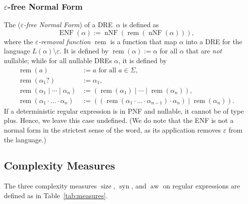 \documentclass[a4paper,11pt, svgnames,titlepage]{article}
\newcommand{\rxp}{{^\mathtt{+}}}
\newcommand{\rxo}{\mathtt{?}}
\newcommand{\rxc}{\cdot}
\DeclareMathOperator{\ror}{\mathtt{|}}
\newcommand{\emptyword}{\varepsilon}
\newcommand{\df}{:=}
\newcommand{\rulefivefun}{p_{R}}
\newcommand{\rulefive}[1]{\rulefivefun{\left(#1\right)}}
\DeclareMathOperator{\remfun}{rem}
\DeclareMathOperator{\enf}{ENF}
\DeclareMathOperator{\nnf}{nNF}
\DeclareMathOperator{\siz}{size}
\DeclareMathOperator{\syn}{syn}
\DeclareMathOperator{\aw}{aw}
\begin{document}
% 
% 
\subsubsection{$\emptyword$-free Normal Form}
The (\emph{$\emptyword$-free Normal Form}) of a DRE~$\alpha$  is defined as 
$$\enf(\alpha)\df\nnf(\remfun(\nnf(\alpha))),$$
where the  \emph{$\emptyword$-removal function} $\remfun$ is a function that map $\alpha$ into a DRE for the language $L(\alpha)\setminus\emptyword$. It is defined by $\remfun(\alpha)\df\alpha$ for all $\alpha$ that are \emph{not} nullable; while for all nullable DREs $\alpha$, it is defined by
\begin{align*}
	\remfun(a)&\df a\text{ for all }a\in \Sigma,\\
	\remfun(\alpha_1\rxo)&\df \alpha_1,\\
	\remfun(\alpha_1\ror \cdots\ror \alpha_n)&\df (\remfun(\alpha_1)\ror \cdots\ror \remfun(\alpha_n)),\\
	\remfun(\alpha_1\rxc \ldots\rxc \alpha_n)&\df ((\remfun(\alpha_1\rxc \ldots\rxc\alpha_{n-1})\rxc\alpha_n)\ror \remfun(\alpha_n)).
\end{align*}
If a deterministic regular expression is in PNF and nullable, it cannot be of type plus. Hence, we leave this case undefined. (We do note that the ENF is not a normal form in the strictest sense of the word, as its application removes $\emptyword$ from the language.) 
\subsection{Complexity Measures}
The three complexity measures $\siz$, $\syn$, and $\aw$ on regular expressions are defined as in Table~\ref{tab:measures}.
\end{document}
